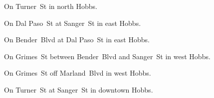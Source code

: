 
\begin{LocationList}

On   Turner~St in north Hobbs.

On  Dal Paso~St at Sanger~St in east Hobbs.

\Location{\GasStation \Gas}
On  Bender~Blvd at  Dal Paso~St in east Hobbs.

On Grimes~St between Bender~Blvd and Sanger~St in west Hobbs.

On Grimes~St off   Marland~Blvd in west Hobbs.

On Turner~St at Sanger~St in downtown Hobbs.

\end{LocationList}
